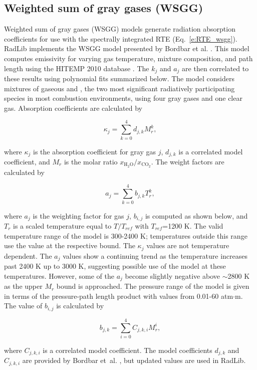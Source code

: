 \documentclass[preprint,12pt]{elsarticle}
\begin{document}

\subsection{Weighted sum of gray gases (WSGG)} \label{s:wsgg}

Weighted sum of gray gases (WSGG) models generate radiation absorption coefficients for use with the spectrally integrated RTE (Eq.~\ref{e:RTE_wsgg}).
RadLib implements the WSGG model presented by Bordbar et al. \citep{Bordbar_2014,Bordbar_2020}. This model computes emissivity for varying gas temperature, mixture composition, and path length using the HITEMP 2010 database \cite{Rothman_2010}. The $k_j$ and $a_j$ are then correlated to these results using polynomial fits summarized below. The model considers mixtures of gaseous  and , the two most significant radiatively participating species in most combustion environments, using four gray gases and one clear gas. Absorption coefficients are calculated by
%
\begin{linenomath}
\begin{equation}
    \kappa_j=\sum_{k=0}^{4}d_{j,k}M_r^k,
\end{equation}
\end{linenomath}
%
where $\kappa_j$ is the absorption coefficient for gray gas $j$, $d_{j,k}$ is a correlated model coefficient, and $M_r$ is the molar ratio $x_{\mathrm{H_2O}}/x_{\mathrm{CO_2}}$. The weight factors are calculated by
%
\begin{linenomath}
\begin{equation}
    a_j=\sum_{k=0}^{4}b_{j,k}T_r^k,
\end{equation}
\end{linenomath}
%
where $a_j$ is the weighting factor for gas $j$, $b_{i,j}$ is computed as shown below,  and $T_r$ is a scaled temperature equal to $T/T_{ref}$ with $T_{ref}$=1200 K. The valid temperature range of the model is 300-2400 K; temperatures outside this range use the value at the respective bound. The $\kappa_j$ values are not temperature dependent. The $a_j$ values show a continuing trend as the temperature increases past 2400 K up to 3000 K, suggesting possible use of the model at these temperatures. However, some of the $a_j$ become slightly negative above $\sim$2800 K as the upper $M_r$ bound is approached. The pressure range of the model is given in terms of the pressure-path length product with values from 0.01-60 atm$\cdot$m. The value of $b_{i,j}$ is calculated by
%
\begin{linenomath}
\begin{equation}
    b_{j,k}=\sum_{i=0}^{4}C_{j,k,i}M_r^i,
\end{equation}
\end{linenomath}
%
where $C_{j,k,i}$ is a correlated model coefficient. The model coefficients $d_{j,k}$ and $C_{j,k,i}$ are provided by Bordbar et~al. \citep{Bordbar_2014,Bordbar_2020}, but updated values are used in RadLib.
\end{document}

